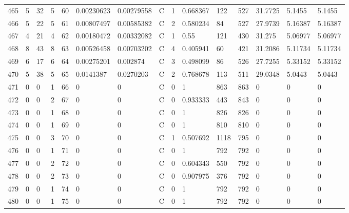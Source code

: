\begin{latin}
\begin{longtable}{lllllllllllllll}
	465 & 5  & 32  & 5  & 60  & 0.00230623     & 0.00279558     & C & 1  & 0.668367 & 122  & 527  & 31.7725 & 5.1455  & 5.1455  \\
	466 & 5  & 22  & 5  & 61  & 0.00807497     & 0.00585382     & C & 2  & 0.580234 & 84   & 527  & 27.9739 & 5.16387 & 5.16387 \\
	467 & 4  & 21  & 4  & 62  & 0.00180472     & 0.00332082     & C & 1  & 0.55     & 121  & 430  & 31.275  & 5.06977 & 5.06977 \\
	468 & 8  & 43  & 8  & 63  & 0.00526458     & 0.00703202     & C & 4  & 0.405941 & 60   & 421  & 31.2086 & 5.11734 & 5.11734 \\
	469 & 6  & 17  & 6  & 64  & 0.00275201     & 0.002874       & C & 3  & 0.498099 & 86   & 526  & 27.7255 & 5.33152 & 5.33152 \\
	470 & 5  & 38  & 5  & 65  & 0.0141387      & 0.0270203      & C & 2  & 0.768678 & 113  & 511  & 29.0348 & 5.0443  & 5.0443  \\
	471 & 0  & 0   & 1  & 66  & 0              & 0              & C & 0  & 1        & 863  & 863  & 0       & 0       & 0       \\
	472 & 0  & 0   & 2  & 67  & 0              & 0              & C & 0  & 0.933333 & 443  & 843  & 0       & 0       & 0       \\
	473 & 0  & 0   & 1  & 68  & 0              & 0              & C & 0  & 1        & 826  & 826  & 0       & 0       & 0       \\
	474 & 0  & 0   & 1  & 69  & 0              & 0              & C & 0  & 1        & 810  & 810  & 0       & 0       & 0       \\
	475 & 0  & 0   & 3  & 70  & 0              & 0              & C & 1  & 0.507692 & 1118 & 795  & 0       & 0       & 0       \\
	476 & 0  & 0   & 1  & 71  & 0              & 0              & C & 0  & 1        & 792  & 792  & 0       & 0       & 0       \\
	477 & 0  & 0   & 2  & 72  & 0              & 0              & C & 0  & 0.604343 & 550  & 792  & 0       & 0       & 0       \\
	478 & 0  & 0   & 2  & 73  & 0              & 0              & C & 0  & 0.907975 & 376  & 792  & 0       & 0       & 0       \\
	479 & 0  & 0   & 1  & 74  & 0              & 0              & C & 0  & 1        & 792  & 792  & 0       & 0       & 0       \\
	480 & 0  & 0   & 1  & 75  & 0              & 0              & C & 0  & 1        & 792  & 792  & 0       & 0       & 0       \\

\end{longtable}
\end{latin}
